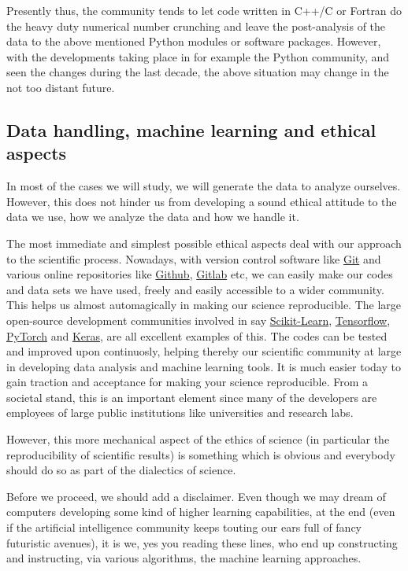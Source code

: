 \documentclass[%
oneside,                 %
final,                   %
10pt]{article}
\begin{document}
Presently thus, the community tends to let
code written in C++/C or Fortran do the heavy duty numerical
number crunching and leave the post-analysis of the data to the above
mentioned Python modules or software packages.  However, with the developments taking place in for example the Python community, and seen
the changes during the last decade, the above situation may change in the not too distant future. 

\subsection{Data handling, machine learning  and ethical aspects}

In most of the cases we will study, we will generate the data
to analyze ourselves. However, this does not hinder us from developing a sound
ethical attitude to the data we use, how we analyze the data and how
we handle it.

The most immediate and simplest possible ethical aspects deal with our
approach to the scientific process. Nowadays, with version control
software like \href{{https://git-scm.com/}}{Git} and various online
repositories like \href{{https://github.com/}}{Github},
\href{{https://about.gitlab.com/}}{Gitlab} etc, we can easily make our codes
and data sets we have used, freely and easily accessible to a wider
community. This helps us almost automagically in making our science
reproducible. The large open-source development communities involved
in say \href{{http://scikit-learn.org/stable/}}{Scikit-Learn},
\href{{https://www.tensorflow.org/}}{Tensorflow},
\href{{http://pytorch.org/}}{PyTorch} and \href{{https://keras.io/}}{Keras}, are
all excellent examples of this. The codes can be tested and improved
upon continuosly, helping thereby our scientific community at large in
developing data analysis and machine learning tools.  It is much
easier today to gain traction and acceptance for making your science
reproducible. From a societal stand, this is an important element
since many of the developers are employees of large public institutions like
universities and research labs.

However, this more mechanical aspect of the ethics of science (in
particular the reproducibility of scientific results) is something
which is obvious and everybody should do so as part of the dialectics of
science. 

Before we proceed, we should add a disclaimer. Even though
we may dream of computers developing some kind of higher learning
capabilities, at the end (even if the artificial intelligence
community keeps touting our ears full of fancy futuristic avenues), it is we, yes you reading these lines,
who end up constructing and instructing, via various algorithms, the
machine learning approaches. 
\end{document}

